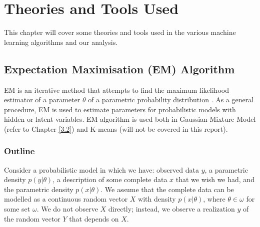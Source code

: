 
\chapter{Theories and Tools Used}
This chapter will cover some theories and tools used in the various machine learning algorithms and our analysis.
\setlength{\belowdisplayskip}{1pt} \setlength{\belowdisplayshortskip}{1pt}
\setlength{\abovedisplayskip}{1pt} \setlength{\abovedisplayshortskip}{1pt}

\section{Expectation Maximisation (EM) Algorithm} \label{2.1}
EM is an iterative method that attempts to find the maximum likelihood estimator of a parameter $\theta$ of a parametric probability distribution \cite{Gupta}. As a general procedure, EM is used to estimate parameters for probabilistic models with hidden or latent variables. EM algorithm is used both in Gaussian Mixture Model (refer to Chapter \ref{3.2}) and K-means (will not be covered in this report). 
\subsection{Outline}
Consider a probabilistic model in which we have: observed data $y$, a parametric density $p(y|\theta)$, a description of some complete data $x$ that we wish we had, and the parametric density $p(x|\theta)$. We assume that the complete data can be modelled as a continuous random vector $X$ with density $p(x|\theta)$, where $\theta \in \omega$ for some set $\omega$. We do not observe $X$ directly; instead, we observe a realization $y$ of the random vector $Y$ that depends on $X$. 

